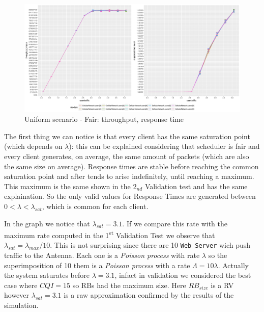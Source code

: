 \begin{figure}[H]
  \includegraphics[width=1\textwidth]{images/unif}
  \caption{Uniform scenario - Fair: throughput, response time}
  \label{fig:Uniform scenario - Fair: throughput, response time}
\end{figure}
The first thing we can notice is that every client has the same saturation point (which depends on \(\lambda\)): this can be explained considering that scheduler is fair and every client generates, on average, the same amount of packets (which are also the same size on average). Response times are stable before reaching the common saturation point and after tends to arise indefinitely, until reaching a maximum. This maximum is the same shown in the \(2_{nd}\) Validation test and has the same explaination. So the only valid values for Response Times are generated between \(0 < \lambda < \lambda_{sat}\), which is common for each client. 

In the graph we notice that \(\lambda_{sat}=3.1\). If we compare this rate with the maximum rate computed in the 1\textsuperscript{st} Validation Test we observe that \(\lambda_{sat} = \lambda_{max}/10\). This is not surprising since there are 10 \texttt{Web Server} wich push traffic to the Antenna. Each one is a \textit{Poisson process} with rate \(\lambda\) so the superimposition of 10 them is a \textit{Poisson process} with a rate \(\Lambda = 10\lambda\). Actually the system saturates before \(\lambda=3.1\), infact in validation we considered the best case where \(CQI=15\) so RBs had the maximum size. Here \(RB_{size}\) is a RV however \(\lambda_{sat}=3.1\) is a raw approximation confirmed by the results of the simulation.

